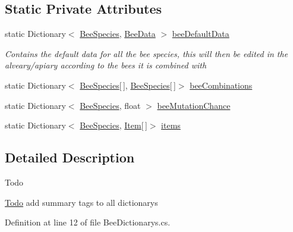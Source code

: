 \subsection*{Static Private Attributes}
\begin{DoxyCompactItemize}
\item 
static Dictionary$<$ \hyperlink{namespace_bee_game_1_1_enums_aa2ead984825678d83c42d48f6382619c}{Bee\+Species}, \hyperlink{struct_bee_game_1_1_bee_1_1_bee_data}{Bee\+Data} $>$ \hyperlink{class_bee_game_1_1_core_1_1_bee_dictionarys_a4bd3dbe3fc155e206801656c07212a96}{bee\+Default\+Data}
\begin{DoxyCompactList}\small\item\em Contains the default data for all the bee species, this will then be edited in the alveary/apiary according to the bees it is combined with \end{DoxyCompactList}\item 
static Dictionary$<$ \hyperlink{namespace_bee_game_1_1_enums_aa2ead984825678d83c42d48f6382619c}{Bee\+Species}\mbox{[}$\,$\mbox{]}, \hyperlink{namespace_bee_game_1_1_enums_aa2ead984825678d83c42d48f6382619c}{Bee\+Species}\mbox{[}$\,$\mbox{]}$>$ \hyperlink{class_bee_game_1_1_core_1_1_bee_dictionarys_a1ebc1dfba158d134ff8b28082c9a2cb2}{bee\+Combinations}
\item 
static Dictionary$<$ \hyperlink{namespace_bee_game_1_1_enums_aa2ead984825678d83c42d48f6382619c}{Bee\+Species}, float $>$ \hyperlink{class_bee_game_1_1_core_1_1_bee_dictionarys_a8928aea7b0d5b04fbf7b5055a9921385}{bee\+Mutation\+Chance}
\item 
static Dictionary$<$ \hyperlink{namespace_bee_game_1_1_enums_aa2ead984825678d83c42d48f6382619c}{Bee\+Species}, \hyperlink{struct_bee_game_1_1_items_1_1_item}{Item}\mbox{[}$\,$\mbox{]}$>$ \hyperlink{class_bee_game_1_1_core_1_1_bee_dictionarys_a08901f100e7fa17a7a441b32ec680146}{items}
\end{DoxyCompactItemize}


\subsection{Detailed Description}


\begin{DoxyRefDesc}{Todo}
\item[\hyperlink{todo__todo000003}{Todo}]add summary tags to all dictionarys \end{DoxyRefDesc}


Definition at line 12 of file Bee\+Dictionarys.\+cs.



